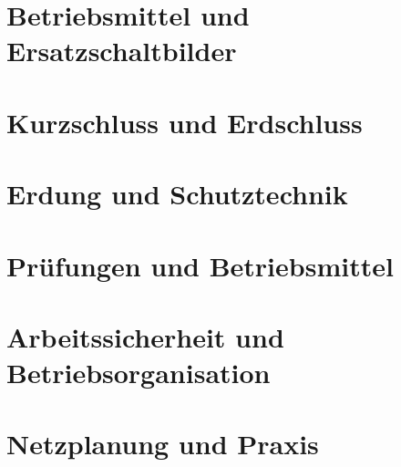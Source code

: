 \documentclass[
    11pt,
    a4paper,
    oneside,
    open=any,
    headings=normal
]{scrbook}
\begin{document}
\part{Betriebsmittel und Ersatzschaltbilder}




\part{Kurzschluss und Erdschluss}




\part{Erdung und Schutztechnik}




\part{Prüfungen und Betriebsmittel}



\part{Arbeitssicherheit und Betriebsorganisation}





\part{Netzplanung und Praxis}



\appendix



\end{document}
